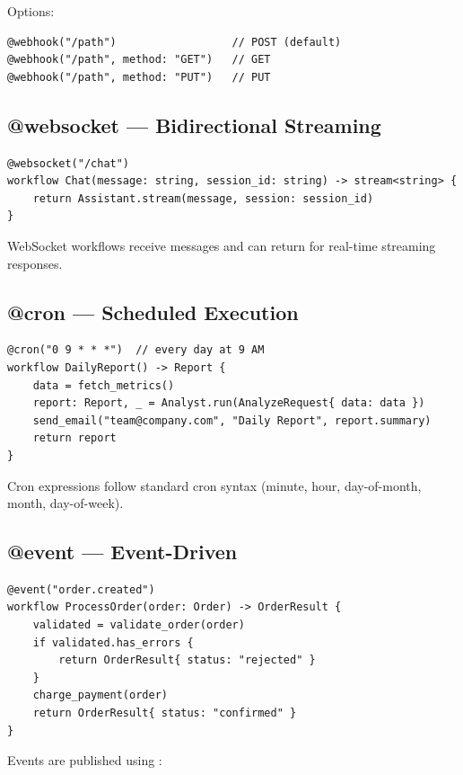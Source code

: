 Options:

\begin{lstlisting}
@webhook("/path")                  // POST (default)
@webhook("/path", method: "GET")   // GET
@webhook("/path", method: "PUT")   // PUT
\end{lstlisting}

\subsection{@websocket --- Bidirectional Streaming}

\begin{lstlisting}
@websocket("/chat")
workflow Chat(message: string, session_id: string) -> stream<string> {
    return Assistant.stream(message, session: session_id)
}
\end{lstlisting}

WebSocket workflows receive messages and can return  for real-time streaming responses.

\subsection{@cron --- Scheduled Execution}

\begin{lstlisting}
@cron("0 9 * * *")  // every day at 9 AM
workflow DailyReport() -> Report {
    data = fetch_metrics()
    report: Report, _ = Analyst.run(AnalyzeRequest{ data: data })
    send_email("team@company.com", "Daily Report", report.summary)
    return report
}
\end{lstlisting}

Cron expressions follow standard cron syntax (minute, hour, day-of-month, month, day-of-week).

\subsection{@event --- Event-Driven}

\begin{lstlisting}
@event("order.created")
workflow ProcessOrder(order: Order) -> OrderResult {
    validated = validate_order(order)
    if validated.has_errors {
        return OrderResult{ status: "rejected" }
    }
    charge_payment(order)
    return OrderResult{ status: "confirmed" }
}
\end{lstlisting}

Events are published using :

